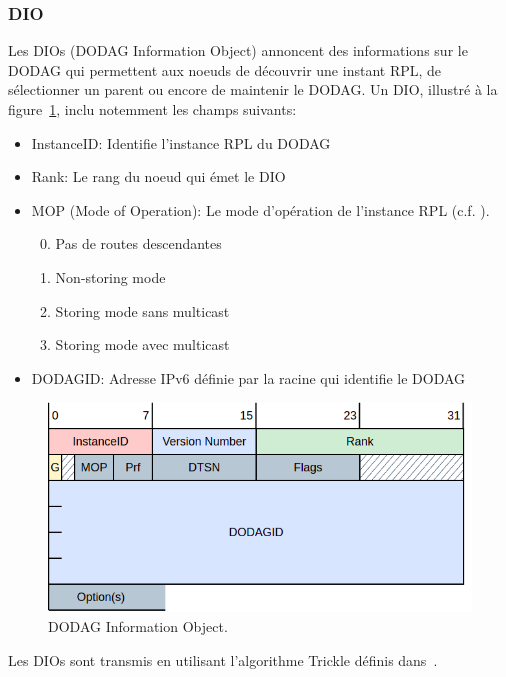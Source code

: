 \subsubsection*{DIO}
    Les DIOs (DODAG Information Object) annoncent des informations sur le DODAG qui permettent aux noeuds de découvrir une instant RPL, de sélectionner un parent ou encore de maintenir le DODAG.
    Un DIO, illustré à la figure~\ref{fig:state-dio}, inclu notemment les champs suivants:
    \begin{itemize}
        \item InstanceID: Identifie l'instance RPL du DODAG
        \item Rank: Le rang du noeud qui émet le DIO
        \item MOP (Mode of Operation): Le mode d'opération de l'instance RPL (c.f. ).
        \begin{enumerate}
            \setcounter{enumi}{-1}
            \item Pas de routes descendantes
            \item Non-storing mode
            \item Storing mode sans multicast
            \item Storing mode avec multicast
        \end{enumerate}
        \item DODAGID: Adresse IPv6 définie par la racine qui identifie le DODAG
    \end{itemize}
    \begin{figure}[H]
        \centering
        \includegraphics[scale=0.5]{res/pictures/dio.drawio.png}
        \caption{DODAG Information Object.}
        \label{fig:state-dio}
    \end{figure}

    Les DIOs sont transmis en utilisant l'algorithme Trickle définis dans~\cite{rfc:trickle}.

